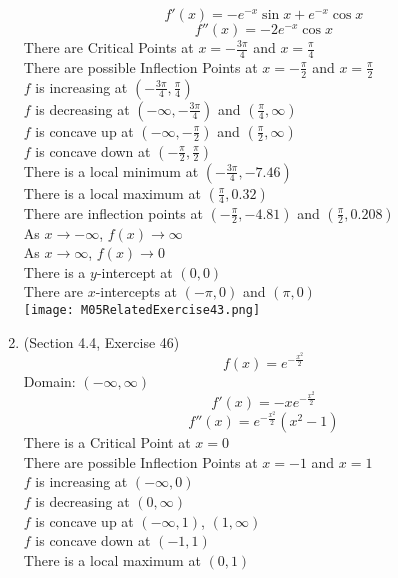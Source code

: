 \documentclass{article}
\begin{document}
\begin{enumerate}
        $$f'(x) = -e^{-x}\sin{x} + e^{-x}\cos{x}$$
        $$f''(x) = -2e^{-x}\cos{x}$$
        There are Critical Points at $x = -\frac{3\pi}{4}$ and $x = \frac{\pi}{4}$ \\
        There are possible Inflection Points at $x = -\frac{\pi}{2}$ and $x = \frac{\pi}{2}$ \\
        $f$ is increasing at $\left(-\frac{3\pi}{4}, \frac{\pi}{4}\right)$ \\
        $f$ is decreasing at $\left(-\infty, -\frac{3\pi}{4}\right)$ and $\left(\frac{\pi}{4}, \infty\right)$ \\
        $f$ is concave up at $\left(-\infty, -\frac{\pi}{2}\right)$ and $\left(\frac{\pi}{2}, \infty\right)$ \\
        $f$ is concave down at $\left(-\frac{\pi}{2}, \frac{\pi}{2}\right)$ \\
        There is a local minimum at $\left(-\frac{3\pi}{4}, -7.46\right)$ \\
        There is a local maximum at $\left(\frac{\pi}{4}, 0.32\right)$ \\
        There are inflection points at $(-\frac{\pi}{2}, -4.81)$ and $(\frac{\pi}{2}, 0.208)$ \\
        As $x \to -\infty$, $f(x) \to \infty$ \\
        As $x \to \infty$, $f(x) \to 0$ \\
        There is a $y$-intercept at $(0, 0)$ \\
        There are $x$-intercepts at $(-\pi, 0)$ and $(\pi, 0)$ \\
        \texttt{[image: M05RelatedExercise43.png]}
    \item (Section 4.4, Exercise 46)
        $$f(x) = e^{-\frac{x^2}{2}}$$
        Domain: $(-\infty, \infty)$ \\
        $$f'(x) = -xe^{-\frac{x^2}{2}}$$
        $$f''(x) = e^{-\frac{x^2}{2}}\left(x^2 - 1\right)$$
        There is a Critical Point at $x = 0$ \\
        There are possible Inflection Points at $x = -1$ and $x = 1$ \\
        $f$ is increasing at $(-\infty, 0)$ \\
        $f$ is decreasing at $(0, \infty)$ \\
        $f$ is concave up at $(-\infty, 1)$, $(1, \infty)$ \\
        $f$ is concave down at $(-1, 1)$ \\
        There is a local maximum at $(0, 1)$ \\

\end{enumerate}
\end{document}
